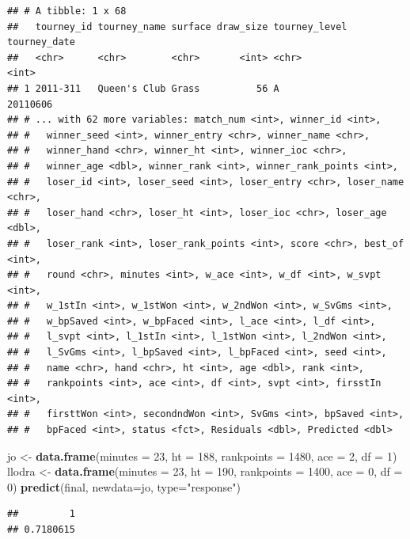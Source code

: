 \documentclass[]{article}
\newenvironment{Shaded}{\begin{snugshade}}{\end{snugshade}}
\newcommand{\DataTypeTok}[1]{\textcolor[rgb]{0.13,0.29,0.53}{#1}}
\newcommand{\DecValTok}[1]{\textcolor[rgb]{0.00,0.00,0.81}{#1}}
\newcommand{\KeywordTok}[1]{\textcolor[rgb]{0.13,0.29,0.53}{\textbf{#1}}}
\newcommand{\NormalTok}[1]{#1}
\newcommand{\StringTok}[1]{\textcolor[rgb]{0.31,0.60,0.02}{#1}}
\begin{document}
\begin{verbatim}
## # A tibble: 1 x 68
##   tourney_id tourney_name surface draw_size tourney_level tourney_date
##   <chr>      <chr>        <chr>       <int> <chr>                <int>
## 1 2011-311   Queen's Club Grass          56 A                 20110606
## # ... with 62 more variables: match_num <int>, winner_id <int>,
## #   winner_seed <int>, winner_entry <chr>, winner_name <chr>,
## #   winner_hand <chr>, winner_ht <int>, winner_ioc <chr>,
## #   winner_age <dbl>, winner_rank <int>, winner_rank_points <int>,
## #   loser_id <int>, loser_seed <int>, loser_entry <chr>, loser_name <chr>,
## #   loser_hand <chr>, loser_ht <int>, loser_ioc <chr>, loser_age <dbl>,
## #   loser_rank <int>, loser_rank_points <int>, score <chr>, best_of <int>,
## #   round <chr>, minutes <int>, w_ace <int>, w_df <int>, w_svpt <int>,
## #   w_1stIn <int>, w_1stWon <int>, w_2ndWon <int>, w_SvGms <int>,
## #   w_bpSaved <int>, w_bpFaced <int>, l_ace <int>, l_df <int>,
## #   l_svpt <int>, l_1stIn <int>, l_1stWon <int>, l_2ndWon <int>,
## #   l_SvGms <int>, l_bpSaved <int>, l_bpFaced <int>, seed <int>,
## #   name <chr>, hand <chr>, ht <int>, age <dbl>, rank <int>,
## #   rankpoints <int>, ace <int>, df <int>, svpt <int>, firsstIn <int>,
## #   firsttWon <int>, secondndWon <int>, SvGms <int>, bpSaved <int>,
## #   bpFaced <int>, status <fct>, Residuals <dbl>, Predicted <dbl>
\end{verbatim}

\begin{Shaded}
\begin{Highlighting}[]
\NormalTok{jo <-}\StringTok{ }\KeywordTok{data.frame}\NormalTok{(}\DataTypeTok{minutes =} \DecValTok{23}\NormalTok{, }\DataTypeTok{ht =} \DecValTok{188}\NormalTok{, }\DataTypeTok{rankpoints =} \DecValTok{1480}\NormalTok{, }\DataTypeTok{ace =} \DecValTok{2}\NormalTok{, }\DataTypeTok{df =} \DecValTok{1}\NormalTok{)}
\NormalTok{llodra <-}\StringTok{ }\KeywordTok{data.frame}\NormalTok{(}\DataTypeTok{minutes =} \DecValTok{23}\NormalTok{, }\DataTypeTok{ht =} \DecValTok{190}\NormalTok{, }\DataTypeTok{rankpoints =} \DecValTok{1400}\NormalTok{, }\DataTypeTok{ace =} \DecValTok{0}\NormalTok{, }\DataTypeTok{df =} \DecValTok{0}\NormalTok{)}
\KeywordTok{predict}\NormalTok{(final, }\DataTypeTok{newdata=}\NormalTok{jo, }\DataTypeTok{type=}\StringTok{"response"}\NormalTok{)}
\end{Highlighting}
\end{Shaded}

\begin{verbatim}
##         1 
## 0.7180615
\end{verbatim}
\end{document}

